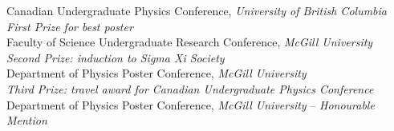 \documentclass[4pt, letterpaper]{article}
\begin{document}
Canadian Undergraduate Physics Conference, \emph{University of British Columbia}\\
\emph{First Prize for best poster}\\
Faculty of Science Undergraduate Research Conference, \emph{McGill University}\\
\emph{Second Prize: induction to Sigma Xi Society}\\
Department of Physics Poster Conference, \emph{McGill University}\\
\emph{Third Prize: travel award for Canadian Undergraduate Physics Conference}\\
Department of Physics Poster Conference, \emph{McGill University} – \emph{Honourable Mention}\\
\end{document}
